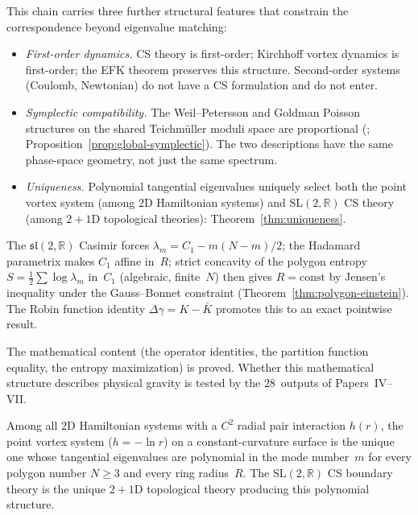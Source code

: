 This chain carries three further structural features
that constrain the correspondence beyond eigenvalue matching:
\begin{itemize}
\item \emph{First-order dynamics.}
  CS theory is first-order; Kirchhoff vortex dynamics
  is first-order; the EFK theorem preserves this structure.
  Second-order systems (Coulomb, Newtonian) do not have
  a CS formulation and do not enter.
\item \emph{Symplectic compatibility.}
  The Weil--Petersson and Goldman Poisson structures
  on the shared Teichm\"uller moduli space are proportional
  (\citealt{Mondello2009};
  Proposition~\ref{prop:global-symplectic}).
  The two descriptions have the same phase-space geometry,
  not just the same spectrum.
\item \emph{Uniqueness.}
  Polynomial tangential eigenvalues uniquely select both
  the point vortex system (among $2$D Hamiltonian systems)
  and $\mathrm{SL}(2,\mathbb{R})$ CS theory
  (among $2{+}1$D topological theories):
  Theorem~\ref{thm:uniqueness}.
\end{itemize}

The $\mathfrak{sl}(2,\mathbb{R})$ Casimir forces
$\lambda_m = C_1 - m(N{-}m)/2$; the Hadamard parametrix
makes $C_1$ affine in~$R$; strict concavity of the
polygon entropy $S = \tfrac{1}{2}\sum\log\lambda_m$ in~$C_1$
(algebraic, finite~$N$) then gives $R = \mathrm{const}$
by Jensen's inequality under the Gauss--Bonnet constraint
(Theorem~\ref{thm:polygon-einstein}).
The Robin function identity $\Delta\gamma = K - \bar{K}$
promotes this to an exact pointwise result.

The mathematical content (the operator identities,
the partition function equality, the entropy maximization)
is proved.
Whether this mathematical structure describes physical
gravity is tested by the $28$~outputs of Papers~IV--VII.

\begin{theorem}
\label{thm:uniqueness}
Among all $2$D Hamiltonian systems with a $C^2$ radial
pair interaction $h(r)$, the point vortex system
($h = -\ln r$) on a constant-curvature surface
is the unique one whose tangential eigenvalues
are polynomial in the mode number~$m$
for every polygon number $N \ge 3$ and every ring radius~$R$.
The $\mathrm{SL}(2,\mathbb{R})$ CS boundary theory is the
unique $2{+}1$D topological theory producing this
polynomial structure.
\end{theorem}

